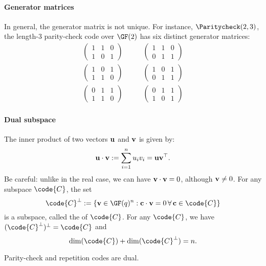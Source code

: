 \documentclass[a4paper, 11pt, openany]{book}
\begin{document}
\paragraph{Generator matrices}
In general, the generator matrix is not unique. For instance, $\Paritycheck(2,3)$, the length-3 parity-check code over $\GF(2)$ has six distinct generator matrices:
\begin{align*}
	\begin{pmatrix}
	1 & 1 & 0\\
	1 & 0 & 1
	\end{pmatrix} \quad & \quad
	\begin{pmatrix}
	1 & 1 & 0\\
	0 & 1 & 1
	\end{pmatrix}\\
	\begin{pmatrix}
	1 & 0 & 1\\
	1 & 1 & 0
	\end{pmatrix} \quad & \quad
	\begin{pmatrix}
	1 & 0 & 1\\
	0 & 1 & 1
	\end{pmatrix}\\
	\begin{pmatrix}
	0 & 1 & 1\\
	1 & 1 & 0
	\end{pmatrix} \quad & \quad
	\begin{pmatrix}
	0 & 1 & 1\\
	1 & 0 & 1
	\end{pmatrix}
\end{align*}



\paragraph{Dual subspace}
The inner product of two vectors ${\bf u}$ and ${\bf v}$ is given by:
\[
	{\bf u} \cdot {\bf v} := \sum_{i=1}^n u_i v_i = {\bf u} {\bf v}^\top.
\]
Be careful: unlike in the real case, we can have ${\bf v} \cdot {\bf v} = 0$, although ${\bf v} \ne 0$. For any subspace $\code{C}$, the set
\[
	\code{C}^\perp := \{{\bf v} \in \GF(q)^n: {\bf c} \cdot {\bf v} = 0 \,\forall\, {\bf c} \in \code{C}\}
\]
is a subspace, called the  of $\code{C}$. For any $\code{C}$, we have $(\code{C}^\perp)^\perp = \code{C}$ and
\[
    \dim(\code{C}) + \dim(\code{C}^\perp) = n.
\]

\begin{theorem}
Parity-check and repetition codes are dual.
\end{theorem}
\end{document}
